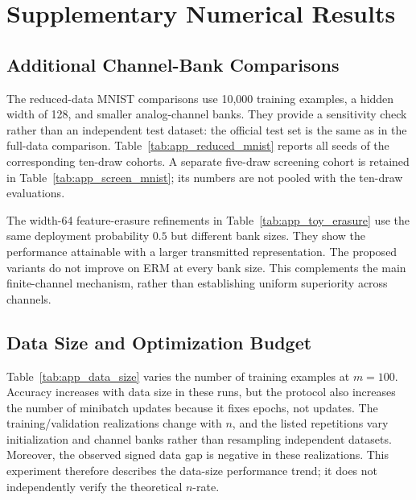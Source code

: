 \providecommand{\simroot}{.}
\section{Supplementary Numerical Results}
\label{app:simulation_results}

\subsection{Additional Channel-Bank Comparisons}
The reduced-data MNIST comparisons use 10,000 training examples, a hidden
width of 128, and smaller analog-channel banks. They provide a sensitivity
check rather than an independent test dataset: the official test set is
the same as in the full-data comparison. Table~\ref{tab:app_reduced_mnist}
reports all seeds of the corresponding ten-draw cohorts. A separate
five-draw screening cohort is retained in
Table~\ref{tab:app_screen_mnist}; its numbers are not pooled with the
ten-draw evaluations.



The width-64 feature-erasure refinements in
Table~\ref{tab:app_toy_erasure} use the same deployment probability $0.5$
but different bank sizes. They show the performance attainable with a
larger transmitted representation. The proposed variants do not improve
on ERM at every bank size. This complements the main finite-channel
mechanism, rather than establishing uniform superiority across channels.


\subsection{Data Size and Optimization Budget}
Table~\ref{tab:app_data_size} varies the number of training examples at
$m=100$. Accuracy increases with data size in these runs, but the protocol
also increases the number of minibatch updates because it fixes epochs,
not updates. The training/validation realizations change with $n$, and the
listed repetitions vary initialization and channel banks rather than
resampling independent datasets. Moreover, the observed signed data gap
is negative in these realizations. This experiment therefore describes
the data-size performance trend; it does not independently verify the
theoretical $n$-rate.


